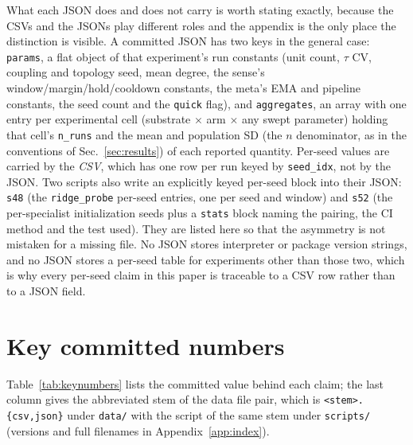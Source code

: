 \documentclass[preprint,12pt]{elsarticle}
\begin{document}
What each JSON does and does not carry is worth stating exactly, because the
CSVs and the JSONs play different roles and the appendix is the only place the
distinction is visible. A committed JSON has two keys in the general case:
\texttt{params}, a flat object of that experiment's run constants (unit count,
$\tau$ CV, coupling and topology seed, mean degree, the sense's
window/margin/hold/cooldown constants, the meta's EMA and pipeline constants,
the seed count and the \texttt{quick} flag), and \texttt{aggregates}, an array
with one entry per experimental cell (substrate $\times$ arm $\times$ any swept
parameter) holding that cell's \texttt{n\_runs} and the mean and population SD
(the $n$ denominator, as in the conventions of Sec.~\ref{sec:results}) of each reported quantity. Per-seed values are carried by the \emph{CSV}, which
has one row per run keyed by \texttt{seed\_idx}, not by the JSON. Two
scripts also write an explicitly keyed per-seed block into their JSON:
\texttt{s48} (the \texttt{ridge\_probe} per-seed entries, one per seed and
window) and \texttt{s52} (the per-specialist initialization seeds plus a
\texttt{stats} block naming the pairing, the CI method and the test used).
They are listed here so that the asymmetry is not mistaken for a missing file.
No JSON stores interpreter or package version strings, and no JSON stores a
per-seed table for experiments other than those two, which is why every
per-seed claim in this paper is traceable to a CSV row rather than to a JSON
field.

\section{Key committed numbers}
\label{app:numbers}

Table~\ref{tab:keynumbers} lists the committed value behind each claim; the
last column gives
the abbreviated stem of the data file pair, which is
\texttt{<stem>.\{csv,json\}} under \texttt{data/} with the script of the same
stem under \texttt{scripts/} (versions and full filenames in
Appendix~\ref{app:index}).
\end{document}
